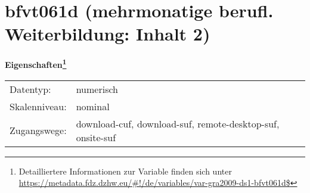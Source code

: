 
    \setcounter{footnote}{0}

    \vspace*{-1.8cm}
	\section{bfvt061d (mehrmonatige berufl. Weiterbildung: Inhalt 2)}
	\label{section:bfvt061d}



    \vspace*{0.5cm}
    \noindent\textbf{Eigenschaften\footnote{Detailliertere Informationen zur Variable finden sich unter
		\url{https://metadata.fdz.dzhw.eu/\#!/de/variables/var-gra2009-ds1-bfvt061d$}}}\\
	\begin{tabularx}{\hsize}{@{}lX}
	Datentyp: & numerisch \\
	Skalenniveau: & nominal \\
	Zugangswege: &
	  download-cuf, 
	  download-suf, 
	  remote-desktop-suf, 
	  onsite-suf
 \\
    \end{tabularx}



